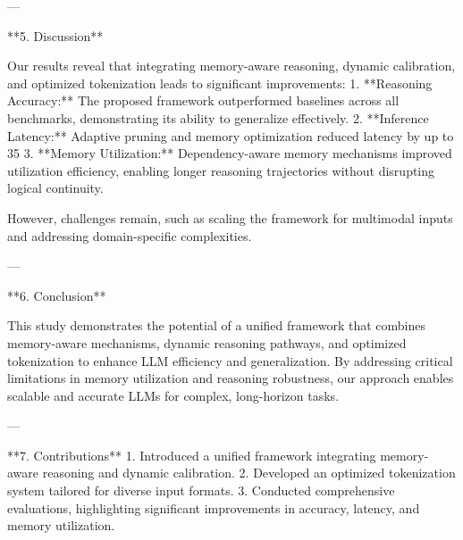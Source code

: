 ---

**5. Discussion**  

Our results reveal that integrating memory-aware reasoning, dynamic calibration, and optimized tokenization leads to significant improvements:  
1. **Reasoning Accuracy:** The proposed framework outperformed baselines across all benchmarks, demonstrating its ability to generalize effectively.  
2. **Inference Latency:** Adaptive pruning and memory optimization reduced latency by up to 35%
3. **Memory Utilization:** Dependency-aware memory mechanisms improved utilization efficiency, enabling longer reasoning trajectories without disrupting logical continuity.  

However, challenges remain, such as scaling the framework for multimodal inputs and addressing domain-specific complexities.

---

**6. Conclusion**  

This study demonstrates the potential of a unified framework that combines memory-aware mechanisms, dynamic reasoning pathways, and optimized tokenization to enhance LLM efficiency and generalization. By addressing critical limitations in memory utilization and reasoning robustness, our approach enables scalable and accurate LLMs for complex, long-horizon tasks.

---

**7. Contributions**  
1. Introduced a unified framework integrating memory-aware reasoning and dynamic calibration.  
2. Developed an optimized tokenization system tailored for diverse input formats.  
3. Conducted comprehensive evaluations, highlighting significant improvements in accuracy, latency, and memory utilization.